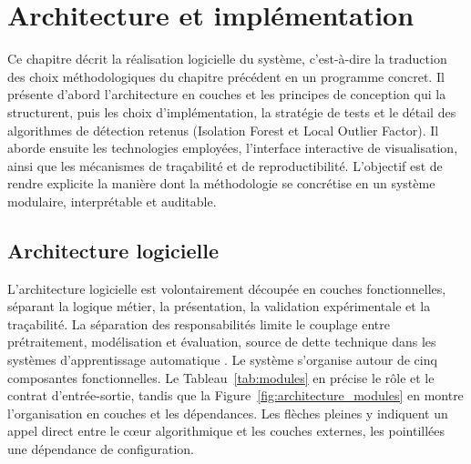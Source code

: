\chapter{Architecture et implémentation}
\label{chapitre:architecture}

Ce chapitre décrit la réalisation logicielle du système, c'est-à-dire la traduction des choix
méthodologiques du chapitre précédent en un programme concret. Il présente d'abord
l'architecture en couches et les principes de conception qui la structurent, puis les choix
d'implémentation, la stratégie de tests et le détail des algorithmes de détection retenus
(Isolation Forest et Local Outlier Factor). Il aborde ensuite les technologies employées,
l'interface interactive de visualisation, ainsi que les mécanismes de traçabilité et de
reproductibilité. L'objectif est de rendre explicite la manière dont la méthodologie se
concrétise en un système modulaire, interprétable et auditable.

\section{Architecture logicielle}

L'architecture logicielle est volontairement découpée en couches fonctionnelles, séparant la
logique métier, la présentation, la validation expérimentale et la traçabilité. La séparation
des responsabilités limite le couplage entre prétraitement, modélisation et évaluation, source
de dette technique dans les systèmes d'apprentissage automatique \citep{sculley2015hidden}. Le
système s'organise autour de cinq composantes fonctionnelles. Le Tableau~\ref{tab:modules} en
précise le rôle et le contrat d'entrée-sortie, tandis que la Figure~\ref{fig:architecture_modules}
en montre l'organisation en couches et les dépendances. Les flèches pleines y indiquent un appel
direct entre le cœur algorithmique et les couches externes, les pointillées une dépendance de
configuration.


